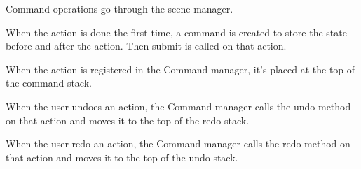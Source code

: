\documentclass[letterpaper,10pt,english,openany,oneside]{sphinxmanual}
\begin{document}
\begin{sphinxVerbatim}[commandchars=\\\{\},numbers=left,firstnumber=102,stepnumber=1]
   
           
\end{sphinxVerbatim}

\begin{DUlineblock}{0em}
\item[] 
\item[] Command operations go through the scene manager.
\end{DUlineblock}

\begin{sphinxVerbatim}[commandchars=\\\{\},numbers=left,firstnumber=65,stepnumber=1]
      
      
\end{sphinxVerbatim}

\begin{DUlineblock}{0em}
\item[] When the action is done the first time, a command is created to store the state before and after the action. Then submit is called on that action.
\item[] When the action is registered in the Command manager, it’s placed at the top of the command stack.
\item[] When the user undoes an action, the Command manager calls the undo method on that action and moves it to the top of the redo stack.
\item[] When the user redo an action, the Command manager calls the redo method on that action and moves it to the top of the undo stack.
\end{DUlineblock}
\end{document}

